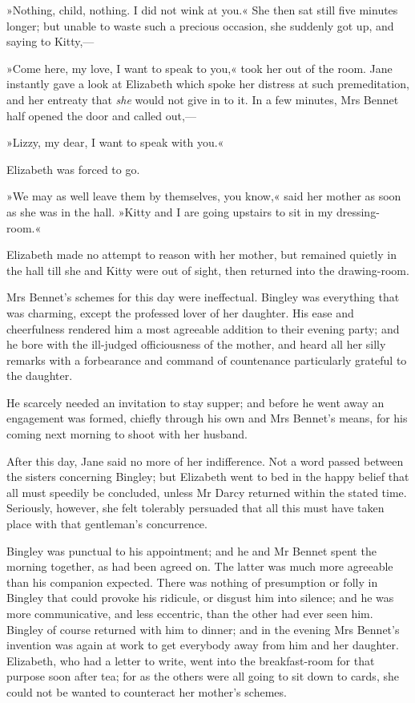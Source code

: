 »Nothing, child, nothing. I did not wink at you.« She then sat still five minutes longer; but unable to waste such a precious occasion, she suddenly got up, and saying to Kitty,—

»Come here, my love, I want to speak to you,« took her out of the room. Jane instantly gave a look at Elizabeth which spoke her distress at such premeditation, and her entreaty that \textit{she} would not give in to it. In a few minutes, Mrs Bennet half opened the door and called out,—

»Lizzy, my dear, I want to speak with you.«

Elizabeth was forced to go.

»We may as well leave them by themselves, you know,« said her mother as soon as she was in the hall. »Kitty and I are going upstairs to sit in my dressing-room.«

Elizabeth made no attempt to reason with her mother, but remained quietly in the hall till she and Kitty were out of sight, then returned into the drawing-room.

Mrs Bennet's schemes for this day were ineffectual. Bingley was everything that was charming, except the professed lover of her daughter. His ease and cheerfulness rendered him a most agreeable addition to their evening party; and he bore with the ill-judged officiousness of the mother, and heard all her silly remarks with a forbearance and command of countenance particularly grateful to the daughter.

He scarcely needed an invitation to stay supper; and before he went away an engagement was formed, chiefly through his own and Mrs Bennet's means, for his coming next morning to shoot with her husband.

After this day, Jane said no more of her indifference. Not a word passed between the sisters concerning Bingley; but Elizabeth went to bed in the happy belief that all must speedily be concluded, unless Mr Darcy returned within the stated time. Seriously, however, she felt tolerably persuaded that all this must have taken place with that gentleman's concurrence.

Bingley was punctual to his appointment; and he and Mr Bennet spent the morning together, as had been agreed on. The latter was much more agreeable than his companion expected. There was nothing of presumption or folly in Bingley that could provoke his ridicule, or disgust him into silence; and he was more communicative, and less eccentric, than the other had ever seen him. Bingley of course returned with him to dinner; and in the evening Mrs Bennet's invention was again at work to get everybody away from him and her daughter. Elizabeth, who had a letter to write, went into the breakfast-room for that purpose soon after tea; for as the others were all going to sit down to cards, she could not be wanted to counteract her mother's schemes.

